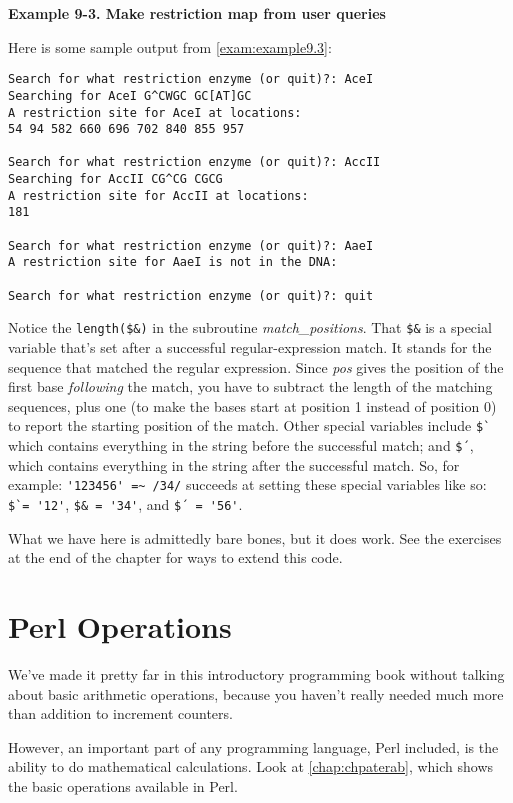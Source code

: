 \textbf{Example 9-3. Make restriction map from user queries}


Here is some sample output from \autoref{exam:example9.3}:

\begin{lstlisting}
Search for what restriction enzyme (or quit)?: AceI
Searching for AceI G^CWGC GC[AT]GC
A restriction site for AceI at locations:
54 94 582 660 696 702 840 855 957

Search for what restriction enzyme (or quit)?: AccII
Searching for AccII CG^CG CGCG
A restriction site for AccII at locations:
181

Search for what restriction enzyme (or quit)?: AaeI
A restriction site for AaeI is not in the DNA:

Search for what restriction enzyme (or quit)?: quit
\end{lstlisting}

Notice the \verb|length($&)| in the subroutine \textit{match\_positions}. That \verb|$&| is a special variable that's set after a successful regular-expression match. It stands for the sequence that matched the regular expression. Since \textit{pos} gives the position of the first base \textit{following} the match, you have to subtract the length of the matching sequences, plus one (to make the bases start at position 1 instead of position 0) to report the starting position of the match. Other special variables include \verb|$`| which contains everything in the string before the successful match; and \verb|$´|, which contains everything in the string after the successful match. So, for example: \verb|'123456' =~ /34/| succeeds at setting these special variables like so: \verb|$`= '12'|, \verb|$& = '34'|, and \verb|$´ = '56'|.

What we have here is admittedly bare bones, but it does work. See the exercises at the end of the chapter for ways to extend this code. 

\section{Perl Operations}
We've made it pretty far in this introductory programming book without talking about basic arithmetic operations, because you haven't really needed much more than addition to increment counters.

However, an important part of any programming language, Perl included, is the ability to do mathematical calculations. Look at \autoref{chap:chpaterab}, which shows the basic operations available in Perl. 

